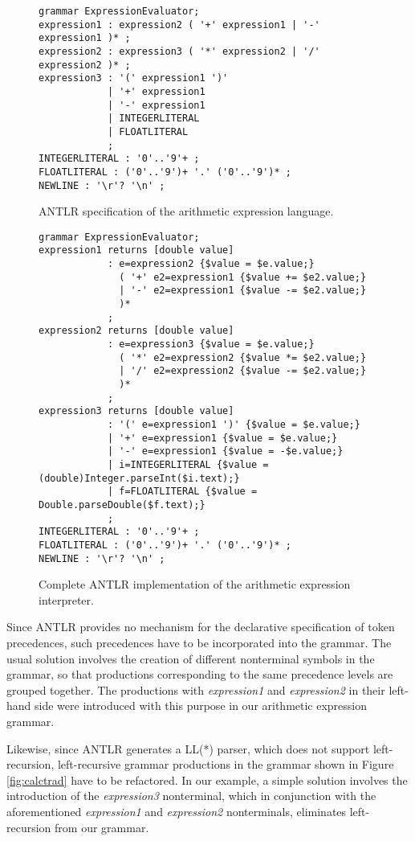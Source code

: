\documentclass[preprint]{elsarticle}
\begin{document}
\begin{figure*}[tb!]
\begin{verbatim}
grammar ExpressionEvaluator;
expression1 : expression2 ( '+' expression1 | '-' expression1 )* ;
expression2 : expression3 ( '*' expression2 | '/' expression2 )* ;
expression3 : '(' expression1 ')'
            | '+' expression1
            | '-' expression1
            | INTEGERLITERAL
            | FLOATLITERAL
            ;
INTEGERLITERAL : '0'..'9'+ ;
FLOATLITERAL : ('0'..'9')+ '.' ('0'..'9')* ;
NEWLINE : '\r'? '\n' ;
\end{verbatim}
\caption{ANTLR specification of the arithmetic expression language.} \label{fig:calcantlr}
\end{figure*}
\begin{figure*}[tb!]
\begin{verbatim}
grammar ExpressionEvaluator;
expression1 returns [double value]
            : e=expression2 {$value = $e.value;}
              ( '+' e2=expression1 {$value += $e2.value;}
              | '-' e2=expression1 {$value -= $e2.value;}
              )*
            ;
expression2 returns [double value]
            : e=expression3 {$value = $e.value;}
              ( '*' e2=expression2 {$value *= $e2.value;}
              | '/' e2=expression2 {$value -= $e2.value;}
              )*
            ;
expression3 returns [double value]
            : '(' e=expression1 ')' {$value = $e.value;}
            | '+' e=expression1 {$value = $e.value;}
            | '-' e=expression1 {$value = -$e.value;}
            | i=INTEGERLITERAL {$value = (double)Integer.parseInt($i.text);}
            | f=FLOATLITERAL {$value = Double.parseDouble($f.text);}
            ;
INTEGERLITERAL : '0'..'9'+ ;
FLOATLITERAL : ('0'..'9')+ '.' ('0'..'9')* ;
NEWLINE : '\r'? '\n' ;
\end{verbatim}
\caption{Complete ANTLR implementation of the arithmetic expression interpreter.} \label{fig:calcimantlr}
\end{figure*}

Since ANTLR provides no mechanism for the declarative specification of token precedences, such precedences have to be incorporated into the grammar.
The usual solution involves the creation of different nonterminal symbols in the grammar, so that productions corresponding to the same precedence levels are grouped together.
The productions with \emph{expression1} and \emph{expression2} in their left-hand side were introduced with this purpose in our arithmetic expression grammar.

Likewise, since ANTLR generates a LL(*) parser, which does not support left-recursion, left-recursive grammar productions in the grammar shown in Figure \ref{fig:calctrad} have to be refactored.
In our example, a simple solution involves the introduction of the \emph{expression3} nonterminal, which in conjunction with the aforementioned \emph{expression1} and \emph{expression2} nonterminals, eliminates left-recursion from our grammar.
\end{document}

